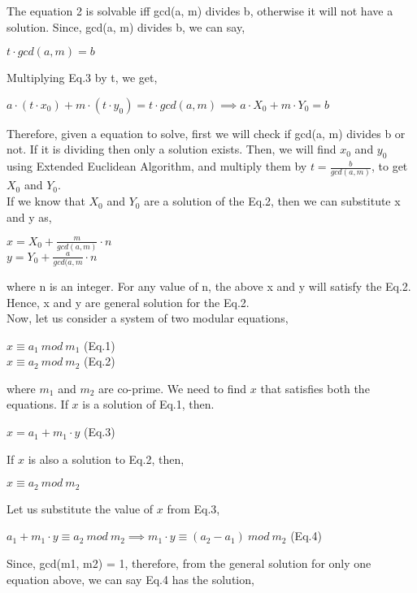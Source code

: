 \documentclass[11pt]{article}
\begin{document}
The equation 2 is solvable iff gcd(a, m) divides b, otherwise it will not have a solution. Since, gcd(a, m) divides b, we can say,
\begin{center}
    $t \cdot gcd(a, m) = b$
\end{center}
Multiplying Eq.3 by t, we get, 
\begin{center}
    $a \cdot (t \cdot x_0) + m \cdot (t\cdot y_0) = t \cdot gcd(a, m) \implies a \cdot  X_0 + m \cdot Y_0 = b$
\end{center}

Therefore, given a equation to solve, first we will check if gcd(a, m) divides b or not. If it is dividing then only a solution exists. Then, we will find $x_0$ and $y_0$ using Extended Euclidean Algorithm, and multiply them by $t = \frac{b}{gcd(a, m)}$, to get $X_0$ and $Y_0$.\\
\newline
If we know that $X_0$ and $Y_0$ are a solution of the Eq.2, then we can substitute x and y as, 
\begin{center}
    $x = X_0 + \frac{m}{gcd(a, m)} \cdot n$\\
    \vspace{1mm}
    $y = Y_0 + \frac{a}{gcd(a, m} \cdot n$
\end{center}
where n is an integer. For any value of n, the above x and y will satisfy the Eq.2. Hence, x and y are general solution for the Eq.2.\\
\newline
Now, let us consider a system of two modular equations,
\begin{center}
    $x \equiv a_1 \ mod \ m_1$   (Eq.1)\\
    $x \equiv a_2 \ mod \ m_2$   (Eq.2)  
\end{center}
where $m_1$ and $m_2$ are co-prime. We need to find $x$ that satisfies both the equations. If $x$ is a solution of Eq.1, then.
\begin{center}
    $x = a_1 + m_1 \cdot y$  (Eq.3)
\end{center}
If $x$ is also a solution to Eq.2, then,
\begin{center}
    $x \equiv a_2 \ mod \ m_2$
\end{center}
Let us substitute the value of $x$ from Eq.3,
\begin{center}
    $a_1 + m_1 \cdot y \equiv a_2 \ mod \ m_2 \implies m_1 \cdot y \equiv (a_2 - a_1) \ mod \ m_2$   (Eq.4)
\end{center}
Since, gcd(m1, m2) = 1, therefore, from the general solution for only one equation above, we can say Eq.4 has the solution,
\end{document}
